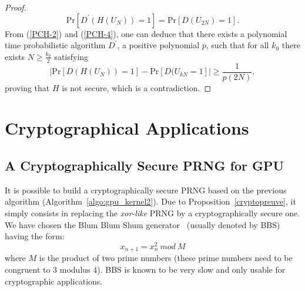 \documentclass{article}
\begin{document}
\begin{proof}
\begin{equation}\label{PCH-4}
\mathrm{Pr}[D^\prime(H(U_{N}))=1]=\mathrm{Pr}[D(U_{2N})=1].
\end{equation}
 From (\ref{PCH-2}) and (\ref{PCH-4}), one can deduce that
there exists a polynomial time probabilistic
algorithm $D^\prime$, a positive polynomial $p$, such that for all $k_0$ there exists
$N\geq \frac{k_0}{2}$ satisfying 
$$| \mathrm{Pr}[D(H(U_{N}))=1]-\mathrm{Pr}[D(U_{kN}=1]|\geq \frac{1}{p(2N)},$$
proving that $H$ is not secure, which is a contradiction. 
\end{proof}


\section{Cryptographical Applications}

\subsection{A Cryptographically Secure PRNG for GPU}
\label{sec:CSGPU}

It is  possible to build a  cryptographically secure PRNG based  on the previous
algorithm (Algorithm~\ref{algo:gpu_kernel2}).   Due to Proposition~\ref{cryptopreuve},
it simply consists  in replacing
the  {\it  xor-like} PRNG  by  a  cryptographically  secure one.  
We have chosen the Blum Blum Shum generator~\cite{BBS} (usually denoted by BBS) having the form:
$$x_{n+1}=x_n^2~ mod~ M$$  where $M$ is the product of  two prime numbers (these
prime numbers  need to be congruent  to 3 modulus  4). BBS is known to be
very slow and only usable for cryptographic applications. 
\end{document}
